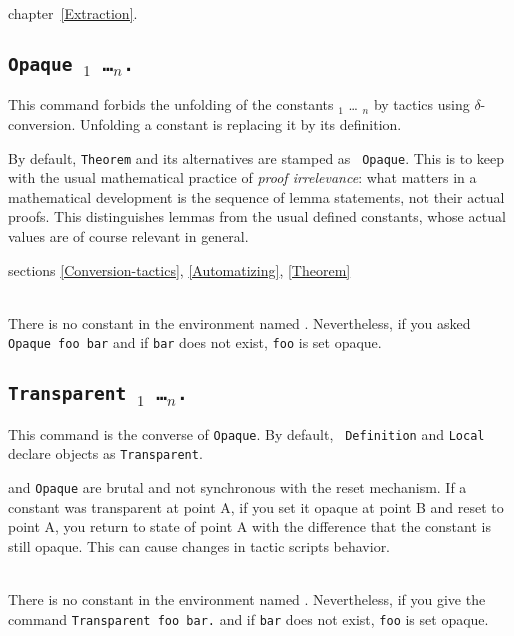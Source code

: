 \SeeAlso chapter~\ref{Extraction}.

\subsection{\tt Opaque \ident$_1$ \dots \ident$_n$.}
\label{Opaque}
This command forbids the unfolding of the constants \ident$_1$ \dots
\ident$_n$  by tactics using $\delta$-conversion. Unfolding a constant
is replacing it by its definition.

By default, {\tt Theorem} and its alternatives are stamped as {\tt
  Opaque}. This is to keep with the usual mathematical practice of
{\em proof irrelevance}: what matters in a mathematical development is
the sequence of lemma statements, not their actual proofs. This
distinguishes lemmas from the usual defined constants, whose actual
values are of course relevant in general.

\SeeAlso sections \ref{Conversion-tactics}, \ref{Automatizing},
\ref{Theorem}

\begin{ErrMsgs}
\item {}\\
    There is no constant in the environment named
    \ident. Nevertheless, if you asked \texttt{Opaque foo bar}
    and if \texttt{bar} does not exist, \texttt{foo} is set opaque.
\end{ErrMsgs}

\subsection{\tt Transparent \ident$_1$ \dots \ident$_n$.}
\label{Transparent}
This command is the converse of {\tt Opaque}. By default, {\tt
  Definition} and {\tt Local} declare objects as {\tt Transparent}.

 and \texttt{Opaque} are brutal and 
not synchronous
with the reset mechanism. If a constant was transparent at point A, if
you set it opaque at point B and reset to point A, you return to state
of point A with the difference that the constant is still opaque. This
can cause changes in tactic scripts behavior.


\begin{ErrMsgs}
\item {}\\
    There is no constant in the environment named
    \ident. Nevertheless, if you give the command \verb|Transparent foo bar.|
    and if \texttt{bar} does not exist, \texttt{foo} is set opaque.
\end{ErrMsgs}

